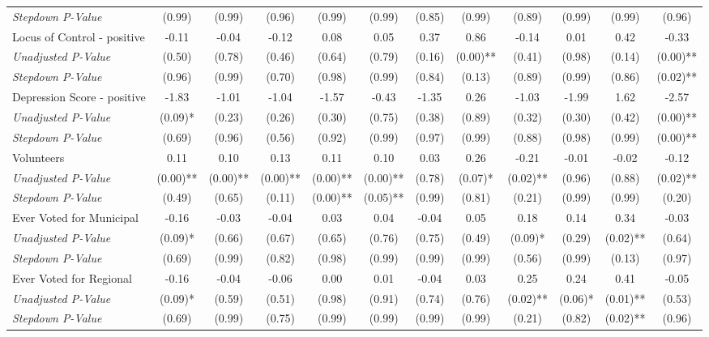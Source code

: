 \begin{tabular}{l c c c c c c c c c c c}
\quad \textit{Stepdown P-Value} & (0.99) & (0.99) & (0.96) & (0.99) & (0.99) & (0.85) & (0.99) & (0.89) & (0.99) & (0.99) & (0.96) \\
Locus of Control - positive & -0.11 & -0.04 & -0.12 & 0.08 & 0.05 & 0.37 & 0.86 & -0.14 & 0.01 & 0.42 & -0.33 \\
\quad \textit{Unadjusted P-Value} & (0.50) & (0.78) & (0.46) & (0.64) & (0.79) & (0.16) & (0.00)** & (0.41) & (0.98) & (0.14) & (0.00)** \\
\quad \textit{Stepdown P-Value} & (0.96) & (0.99) & (0.70) & (0.98) & (0.99) & (0.84) & (0.13) & (0.89) & (0.99) & (0.86) & (0.02)** \\
Depression Score - positive & -1.83 & -1.01 & -1.04 & -1.57 & -0.43 & -1.35 & 0.26 & -1.03 & -1.99 & 1.62 & -2.57 \\
\quad \textit{Unadjusted P-Value} & (0.09)* & (0.23) & (0.26) & (0.30) & (0.75) & (0.38) & (0.89) & (0.32) & (0.30) & (0.42) & (0.00)** \\
\quad \textit{Stepdown P-Value} & (0.69) & (0.96) & (0.56) & (0.92) & (0.99) & (0.97) & (0.99) & (0.88) & (0.98) & (0.99) & (0.00)** \\
Volunteers & 0.11 & 0.10 & 0.13 & 0.11 & 0.10 & 0.03 & 0.26 & -0.21 & -0.01 & -0.02 & -0.12 \\
\quad \textit{Unadjusted P-Value} & (0.00)** & (0.00)** & (0.00)** & (0.00)** & (0.00)** & (0.78) & (0.07)* & (0.02)** & (0.96) & (0.88) & (0.02)** \\
\quad \textit{Stepdown P-Value} & (0.49) & (0.65) & (0.11) & (0.00)** & (0.05)** & (0.99) & (0.81) & (0.21) & (0.99) & (0.99) & (0.20) \\
Ever Voted for Municipal & -0.16 & -0.03 & -0.04 & 0.03 & 0.04 & -0.04 & 0.05 & 0.18 & 0.14 & 0.34 & -0.03 \\
\quad \textit{Unadjusted P-Value} & (0.09)* & (0.66) & (0.67) & (0.65) & (0.76) & (0.75) & (0.49) & (0.09)* & (0.29) & (0.02)** & (0.64) \\
\quad \textit{Stepdown P-Value} & (0.69) & (0.99) & (0.82) & (0.98) & (0.99) & (0.99) & (0.99) & (0.56) & (0.99) & (0.13) & (0.97) \\
Ever Voted for Regional & -0.16 & -0.04 & -0.06 & 0.00 & 0.01 & -0.04 & 0.03 & 0.25 & 0.24 & 0.41 & -0.05 \\
\quad \textit{Unadjusted P-Value} & (0.09)* & (0.59) & (0.51) & (0.98) & (0.91) & (0.74) & (0.76) & (0.02)** & (0.06)* & (0.01)** & (0.53) \\
\quad \textit{Stepdown P-Value} & (0.69) & (0.99) & (0.75) & (0.99) & (0.99) & (0.99) & (0.99) & (0.21) & (0.82) & (0.02)** & (0.96) \\

\end{tabular}
